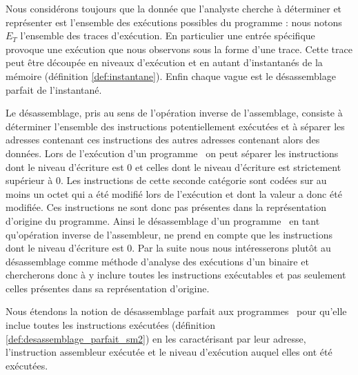Nous considérons toujours que la donnée que l'analyste cherche à déterminer et représenter est l'ensemble des exécutions possibles du programme : nous notons $E_T$ l'ensemble des traces d'exécution.
En particulier une entrée spécifique provoque une exécution que nous observons sous la forme d'une trace.
Cette trace peut être découpée en niveaux d'exécution et en autant d'instantanés de la mémoire (définition \ref{def:instantane}). Enfin chaque vague est le désassemblage parfait de l'instantané.

Le désassemblage, pris au sens de l'opération inverse de l'assemblage, consiste à déterminer l'ensemble des instructions potentiellement exécutées et à séparer les adresses contenant ces instructions des autres adresses contenant alors des données.
Lors de l'exécution d'un programme \sm\ on peut séparer les instructions dont le niveau d'écriture est 0 et celles dont le niveau d'écriture est strictement supérieur à 0.
Les instructions de cette seconde catégorie sont codées sur au moins un octet qui a été modifié lors de l'exécution et dont la valeur a donc été modifiée. Ces instructions ne sont donc pas présentes dans la représentation d'origine du programme.
Ainsi le désassemblage d'un programme \sm\, en tant qu'opération inverse de l'assembleur, ne prend en compte que les instructions dont le niveau d'écriture est 0.
Par la suite nous nous intéresserons plutôt au désassemblage comme méthode d'analyse des exécutions d'un binaire et chercherons donc à y inclure toutes les instructions exécutables et pas seulement celles présentes dans sa représentation d'origine.

Nous étendons la notion de désassemblage parfait aux programmes \sms\ pour qu'elle inclue toutes les instructions exécutées (définition \ref{def:desassemblage_parfait_sm2}) en les caractérisant par leur adresse, l'instruction assembleur exécutée et le niveau d'exécution auquel elles ont été exécutées.


